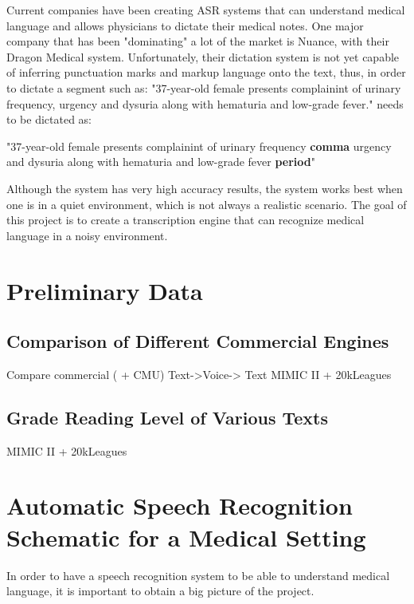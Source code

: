 Current companies have been creating ASR systems that can understand medical language and allows physicians to dictate their medical notes. One major company that has been "dominating" a lot of the market is Nuance, with their Dragon Medical system. Unfortunately, their dictation system is not yet capable of inferring punctuation marks and markup language onto the text, thus, in order to dictate a segment such as: "37-year-old female presents complainint of urinary frequency, urgency and dysuria along with hematuria and low-grade fever." needs to be dictated as:

\begin{center}
    "37-year-old female presents complainint of urinary frequency \textbf{comma} urgency and dysuria along with hematuria and low-grade fever \textbf{period}"
\end{center}

Although the system has very high accuracy results, the system works best when one is in a quiet environment, which is not always a realistic scenario. The goal of this project is to create a transcription engine that can recognize medical language in a noisy environment.

\section{Preliminary Data}

\subsection{Comparison of Different Commercial Engines}

Compare commercial ( + CMU)
Text->Voice-> Text
MIMIC II + 20kLeagues


\subsection{Grade Reading Level of Various Texts}
MIMIC II + 20kLeagues

\section{Automatic Speech Recognition Schematic for a Medical Setting}

In order to have a speech recognition system to be able to understand medical language, it is important to obtain a big picture of the project.


